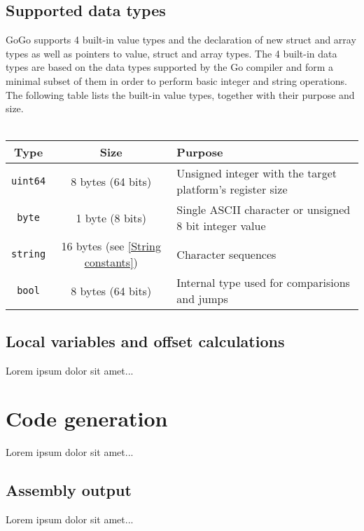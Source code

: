 \documentclass[a4paper]{scrreprt}
\begin{document}
    \section{Supported data types}
      GoGo supports 4 built-in value types and the declaration of new struct and array types as well as pointers to value, struct and array types. The 4 built-in data types are based on the data types supported by the Go compiler and form a minimal subset of them in order to perform basic integer and string operations. The following table lists the built-in value types, together with their purpose and size.\\ \\
      \begin{tabular}{|c|c|l|}
        \hline
        \textbf{Type} & \textbf{Size} & \textbf{Purpose}\\ \hline
        \texttt{uint64} & 8 bytes (64 bits) & Unsigned integer with the target platform's register size\\ \hline
        \texttt{byte} & 1 byte (8 bits) & Single ASCII character or unsigned 8 bit integer value\\ \hline
        \texttt{string} & 16 bytes (see \ref{String constants}) & Character sequences\\ \hline
        \texttt{bool} & 8 bytes (64 bits) & Internal type used for comparisions and jumps\\ \hline
      \end{tabular}
		
    \section{Local variables and offset calculations}
      Lorem ipsum dolor sit amet...

  \chapter{Code generation}
     Lorem ipsum dolor sit amet...

    \section{Assembly output}
      Lorem ipsum dolor sit amet...
\end{document}
